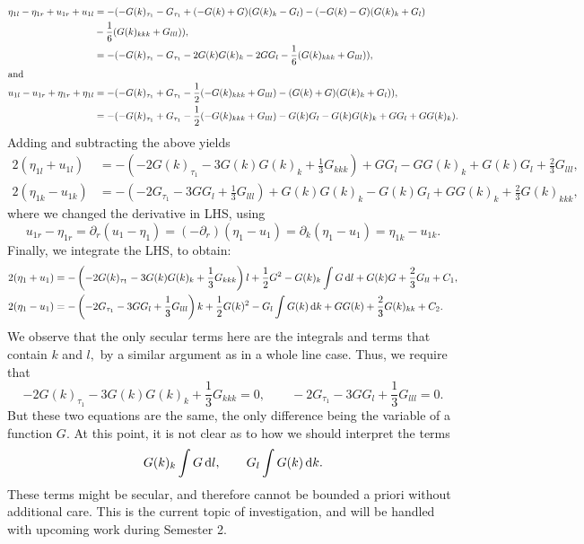 \documentclass[10pt,reqno,oneside,a4paper]{article}
\begin{document}
\begin{align*}
\eta_{1l} - \eta_{1r} + u_{1r} + u_{1l} &= - (-G(k)_{\tau_1} - G_{\tau_1} + (-G(k) + G)(G(k)_k - G_l) - (-G(k) - G)(G(k)_k + G_l)\\
&- \frac{1}{6}(G(k)_{kkk}+G_{lll})), \\
&= -(-G(k)_{\tau_1} - G_{\tau_1} - 2G(k)G(k)_k - 2G G_l - \frac{1}{6}(G(k)_{kkk}+G_{lll})), \\
\intertext{and}
u_{1l} - u_{1r} + \eta_{1r} + \eta_{1l}  &= - (-G(k)_{\tau_1} + G_{\tau_1} - \frac{1}{2}(-G(k)_{kkk} + G_{lll}) - (G(k) + G)(G(k)_k+G_l)), \\
&=  - (-G(k)_{\tau_1} + G_{\tau_1} - \frac{1}{2}(-G(k)_{kkk} + G_{lll}) - G(k)G_l - G(k)G(k)_k + G G_l+GG(k)_k).
\end{align*}
Adding and subtracting the above yields
\begin{align*}
2(\eta_{1l} + u_{1l}) &= -\left( -2G(k)_{\tau_1} - 3 G(k)G(k)_k + \frac{1}{3}G_{kkk} \right) + GG_l  - G G(k)_k + G(k)G_l + \frac{2}{3} G_{lll}, \\
2(\eta_{1k} - u_{1k}) &=  - \left(-2G_{\tau_1} - 3GG_l + \frac{1}{3}G_{lll}\right) + G(k)G(k)_k - G(k)G_l + G G(k)_k + \frac{2}{3}G(k)_{kkk}, 
\end{align*}
where we changed the derivative in LHS, using
\[ 
u_{1r} - \eta_{1r} = \partial_r (u_1 - \eta_1) = (-\partial_r)(\eta_1 - u_1) = \partial_k(\eta_1 - u_1) = \eta_{1k} - u_{1k}.
\]
Finally, we integrate the LHS, to obtain:
\begin{align*}
2(\eta_{1} + u_{1}) &= -\left(-2G(k)_{\tau_1} - 3 G(k)G(k)_k + \frac{1}{3}G_{kkk}\right)l + \frac{1}{2}G^2  - G(k)_k \int G \,\mathrm{d} l + G(k)G + \frac{2}{3} G_{ll} + C_1, \\
2(\eta_{1} - u_{1}) &=  - \left(-2G_{\tau_1} - 3GG_l + \frac{1}{3}G_{lll}\right)k + \frac{1}{2}G(k)^2 - G_l \int G(k) \,\mathrm{d} k +GG(k) + \frac{2}{3}G(k)_{kk} + C_2. 
\end{align*}
We observe that the only secular terms here are the integrals and terms that contain $k$ and $l,$ by a similar argument as in a whole line case. Thus, we require that 
\[ 
-2G(k)_{\tau_1} - 3 G(k)G(k)_k + \frac{1}{3}G_{kkk} = 0, \qquad -2G_{\tau_1} - 3GG_l + \frac{1}{3}G_{lll} = 0.
\] 
But these two equations are the same, the only difference being the variable of a function $G.$ At this point, it is not clear as to how we should interpret the terms 
\[ G(k)_k \int G \,\mathrm{d} l,  \qquad G_l \int G(k) \,\mathrm{d} k. \]
These terms might be secular, and therefore cannot be bounded a priori without additional care. This is the current topic of investigation, and will be handled with upcoming work during Semester 2. 
\end{document}
